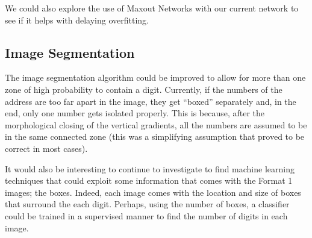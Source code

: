\documentclass{article} %
\begin{document}
We could also explore the use of Maxout Networks\cite{maxout} with our current network to see if it helps with delaying overfitting.

\subsection{Image Segmentation}
The image segmentation algorithm could be improved to allow for more than one zone of high probability to contain a digit. Currently, if the numbers of the address are too far apart in the image, they get “boxed” separately and, in the end, only one number gets isolated properly. This is because, after the morphological closing of the vertical gradients, all the numbers are assumed to be in the same connected zone (this was a simplifying assumption that proved to be correct in most cases).

It would also be interesting to continue to investigate to find machine learning techniques that could exploit some information that comes with the Format 1 images; the boxes. Indeed, each image comes with the location and size of boxes that surround the each digit. Perhaps, using the number of boxes, a classifier could be trained in a supervised manner to find the number of digits in each image. 



\end{document}
